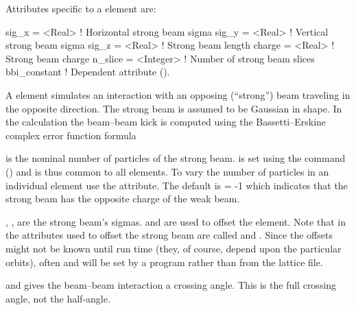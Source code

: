 Attributes specific to a  element are:
\begin{example}
  sig_x   = <Real>     ! Horizontal strong beam sigma   
  sig_y   = <Real>     ! Vertical strong beam sigma
  sig_z   = <Real>     ! Strong beam length
  charge  = <Real>     ! Strong beam charge
  n_slice = <Integer>  ! Number of strong beam slices 
  bbi_constant         ! Dependent attribute ().
\end{example}

A  element simulates an interaction with an opposing
(``strong'') beam traveling in the opposite direction. The strong beam
is assumed to be Gaussian in shape. In the 
calculation the beam--beam kick is computed using the
Bassetti--Erskine complex error function formula\cite{b:talman}

 is the nominal number of particles of the strong
beam.  is set using the  command
() and is thus common to all  elements.  To
vary the number of particles in an individual  element use the
 attribute. The default is  = -1 which indicates
that the strong beam has the opposite charge of the weak beam.

, ,  are the strong beam's sigmas. 
 and  are used to offset the
 element. Note that in \mad the attributes used to
offset the strong beam are called  and . Since the
offsets might not be known until run time (they, of course, depend
upon the particular orbits), often  and 
will be set by a program rather than from the lattice file.

 and  gives the beam--beam interaction a
crossing angle. This is the full crossing angle, not the half-angle.

